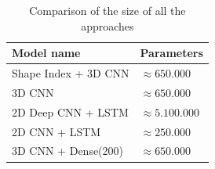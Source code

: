 \documentclass[12pt]{article}
\theoremstyle{definition}
\begin{document}
	\begin{table}[h]
		\centering
		\renewcommand{\arraystretch}{1.5}

		\caption{Comparison of the size of all the approaches}
		\label{table:all-zise}

		\begin{tabular}{ll}
			\textbf{Model name}  &\textbf{Parameters} \\ \hline
			Shape Index + 3D CNN & $\approx 650.000$   \\ \hline
			3D CNN               & $\approx 650.000$   \\ \hline
			2D Deep CNN + LSTM   & $\approx 5.100.000$ \\ \hline
			2D CNN + LSTM        & $\approx 250.000$   \\ \hline
			3D CNN + Dense(200)  & $\approx 650.000$   \\
		\end{tabular}
	\end{table}
\end{document}
